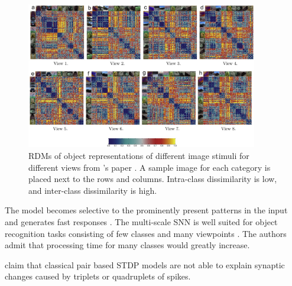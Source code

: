 \begin{figure}[htbp]
    \center
    \includegraphics[width=0.9\textwidth]{pictures/inter_intra_category_dissimilarity.jpg}
    \caption{\acp{RDM} of object representations of different image stimuli for different views from \authorsmultiScaleSTDP{}'s paper \cite{multi_scale_STDP}.
    A sample image for each category is placed next to the rows and columns.
    Intra-class dissimilarity is low, and inter-class dissimilarity is high.}
    \label{fig:RDM_SNN}
\end{figure}
%
The model becomes selective to the prominently present patterns in the input and generates fast responses \cite{STDP_vis_feat}.
The multi-scale \ac{SNN} is well suited for object recognition tasks consisting of few classes and many viewpoints \cite{multi_scale_STDP}.
The authors admit that processing time for many classes would greatly increase.

\authorsSTDPtriplet{} \cite{STDP_triplet} claim that classical pair based \ac{STDP} models 
are not able to explain synaptic changes caused by triplets or quadruplets of spikes.